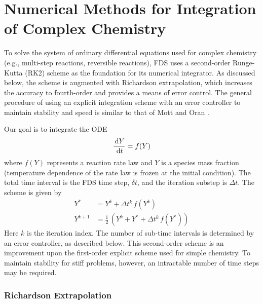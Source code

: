 \chapter{Numerical Methods for Integration of Complex Chemistry}
\label{chemistry_integration}

To solve the system of ordinary differential equations used for complex chemistry (e.g., multi-step reactions, reversible reactions), FDS uses a second-order Runge-Kutta (RK2) scheme as the foundation for its numerical integrator.  As discussed below, the scheme is augmented with Richardson extrapolation, which increases the accuracy to fourth-order and provides a means of error control. The general procedure of using an explicit integration scheme with an error controller to maintain stability and speed is similar to that of Mott and Oran \cite{Mott:2001}.

Our goal is to integrate the ODE
\begin{equation}
\frac{\,\mathrm{d} Y}{\,\mathrm{d} t} = f(Y)
\end{equation}
where $f(Y)$ represents a reaction rate law and $Y$ is a species mass fraction (temperature dependence of the rate law is frozen at the initial condition).  The total time interval is the FDS time step, $\delta t$, and the iteration substep is $\Delta t$. The scheme is given by
\begin{align}
\label{RK2-1} Y^* &= Y^k + \Delta t^k \, f(Y^k) \\
\label{RK2-2} Y^{k+1}   &= \frac{1}{2}\,(Y^k + Y^* + \Delta t^k \, f(Y^*))
\end{align}
Here $k$ is the iteration index.  The number of sub-time intervals is determined by an error controller, as described below. This second-order scheme is an improvement upon the first-order explicit scheme used for simple chemistry. To maintain stability for stiff problems, however, an intractable number of time steps may be required.

\subsection*{Richardson Extrapolation}

